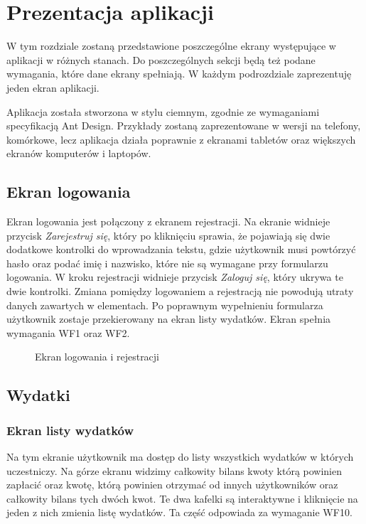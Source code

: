 \newpage
\section{Prezentacja aplikacji}
W tym rozdziale zostaną przedstawione poszczególne ekrany występujące w aplikacji w różnych stanach. Do poszczególnych sekcji będą też podane wymagania, które dane ekrany spełniają. W każdym podrozdziale zaprezentuję jeden ekran aplikacji.


Aplikacja została stworzona w stylu ciemnym, zgodnie ze wymaganiami specyfikacją Ant Design. Przykłady zostaną zaprezentowane w wersji na telefony, komórkowe, lecz aplikacja działa poprawnie z ekranami tabletów oraz większych ekranów komputerów i laptopów.

\clearpage
\subsection{Ekran logowania}
Ekran logowania jest połączony z ekranem rejestracji. Na ekranie widnieje przycisk \emph{Zarejestruj się}, który po kliknięciu sprawia, że pojawiają się dwie dodatkowe kontrolki do wprowadzania tekstu, gdzie użytkownik musi powtórzyć hasło oraz podać imię i nazwisko, które nie są wymagane przy formularzu logowania. W kroku rejestracji widnieje przycisk \emph{Zaloguj się}, który ukrywa te dwie kontrolki. Zmiana pomiędzy logowaniem a rejestracją nie powodują utraty danych zawartych w elementach. Po poprawnym wypełnieniu formularza użytkownik zostaje przekierowany na ekran listy wydatków. Ekran spełnia wymagania WF1 oraz WF2.


\begin{figure}[h!]%
    \centering
    \qquad
    \caption{Ekran logowania i rejestracji}%
\end{figure}

\clearpage
\subsection{Wydatki}
\subsubsection{Ekran listy wydatków}
Na tym ekranie użytkownik ma dostęp do listy wszystkich wydatków w których uczestniczy. Na górze ekranu widzimy całkowity bilans kwoty którą powinien zapłacić oraz kwotę, którą powinien otrzymać od innych użytkowników oraz całkowity bilans tych dwóch kwot. Te dwa kafelki są interaktywne i kliknięcie na jeden z nich zmienia listę wydatków. Ta część odpowiada za wymaganie WF10.

